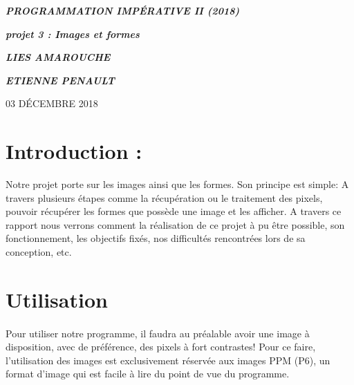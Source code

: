 \documentclass[a4paper , 10pt]{article}
\begin{document}
\begin{center}
\begin{huge}
\textit{\textbf{PROGRAMMATION IMPÉRATIVE II (2018)}}
\end{huge}
\end{center}
\begin{center}
\begin{LARGE}
\textit{\textbf{projet 3 : Images et formes}}
\end{LARGE}
\end{center}
\textit{}
\textit{}
\begin{flushleft}
\begin{Large}
\textbf{\textit{LIES AMAROUCHE}}
\end{Large}
\end{flushleft}
\begin{flushright}
\begin{Large}
\textbf{\textit{ETIENNE PENAULT}}
\end{Large}
\end{flushright}
\begin{center}
03 D\'ECEMBRE 2018
\end{center}
\section{Introduction :}
\quad Notre projet porte sur les images ainsi que les formes. Son principe est simple: A travers plusieurs étapes comme la récupération ou le traitement des pixels, pouvoir récupérer les formes que possède une image et les afficher. A travers ce rapport nous verrons comment la réalisation de ce projet à pu être possible, son fonctionnement, les objectifs fixés, nos difficultés rencontrées lors de sa conception, etc.
\section{Utilisation}
\paragraph{}
Pour utiliser notre programme, il faudra au préalable avoir une image à disposition, avec de préférence, des pixels à fort contrastes! Pour ce faire, l'utilisation des images est exclusivement réservée aux images PPM (P6), un format d'image qui est facile à lire du point de vue du programme.
\end{document}
